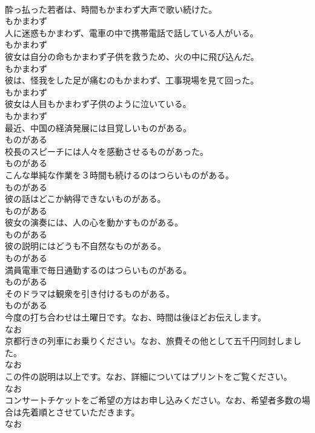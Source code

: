 \documentclass[8pt]{extreport}
\begin{document}
\begin{CJK}{UTF8}{min}
\\	酔っ払った若者は、時間もかまわず大声で歌い続けた。	
\\	もかまわず	
\\	人に迷惑もかまわず、電車の中で携帯電話で話している人がいる。	
\\	もかまわず	
\\	彼女は自分の命もかまわず子供を救うため、火の中に飛び込んだ。	
\\	もかまわず	
\\	彼は、怪我をした足が痛むのもかまわず、工事現場を見て回った。	
\\	もかまわず	
\\	彼女は人目もかまわず子供のように泣いている。	
\\	もかまわず	
\\	最近、中国の経済発展には目覚しいものがある。	
\\	ものがある	
\\	校長のスピーチには人々を感動させるものがあった。	
\\	ものがある	
\\	こんな単純な作業を３時間も続けるのはつらいものがある。	
\\	ものがある	
\\	彼の話はどこか納得できないものがある。	
\\	ものがある	
\\	彼女の演奏には、人の心を動かすものがある。	
\\	ものがある	
\\	彼の説明にはどうも不自然なものがある。	
\\	ものがある	
\\	満員電車で毎日通勤するのはつらいものがある。	
\\	ものがある	
\\	そのドラマは観衆を引き付けるものがある。	
\\	ものがある	
\\	今度の打ち合わせは土曜日です。なお、時間は後ほどお伝えします。	
\\	なお	
\\	京都行きの列車にお乗りください。なお、旅費その他として五千円同封しました。	
\\	なお	
\\	この件の説明は以上です。なお、詳細についてはプリントをご覧ください。	
\\	なお	
\\	コンサートチケットをご希望の方はお申し込みください。なお、希望者多数の場合は先着順とさせていただきます。	
\\	なお	

\end{CJK}
\end{document}

